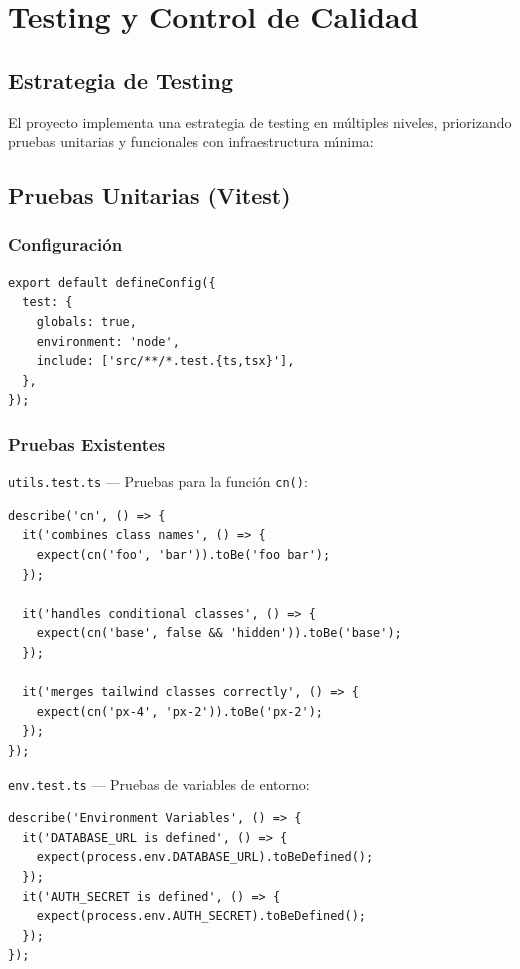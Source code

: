 \chapter{Testing y Control de Calidad}

\section{Estrategia de Testing}

El proyecto implementa una estrategia de testing en m\'ultiples niveles,
priorizando pruebas unitarias y funcionales con infraestructura m\'{\i}nima:

\section{Pruebas Unitarias (Vitest)}

\subsection{Configuraci\'on}

\begin{lstlisting}[style=typescript, caption=vitest.config.ts]
export default defineConfig({
  test: {
    globals: true,
    environment: 'node',
    include: ['src/**/*.test.{ts,tsx}'],
  },
});
\end{lstlisting}

\subsection{Pruebas Existentes}

\texttt{utils.test.ts} --- Pruebas para la funci\'on \texttt{cn()}:

\begin{lstlisting}[style=typescript, caption=Pruebas unitarias para cn()]
describe('cn', () => {
  it('combines class names', () => {
    expect(cn('foo', 'bar')).toBe('foo bar');
  });

  it('handles conditional classes', () => {
    expect(cn('base', false && 'hidden')).toBe('base');
  });

  it('merges tailwind classes correctly', () => {
    expect(cn('px-4', 'px-2')).toBe('px-2');
  });
});
\end{lstlisting}

\texttt{env.test.ts} --- Pruebas de variables de entorno:

\begin{lstlisting}[style=typescript, caption=Pruebas de variables de entorno]
describe('Environment Variables', () => {
  it('DATABASE_URL is defined', () => {
    expect(process.env.DATABASE_URL).toBeDefined();
  });
  it('AUTH_SECRET is defined', () => {
    expect(process.env.AUTH_SECRET).toBeDefined();
  });
});
\end{lstlisting}

